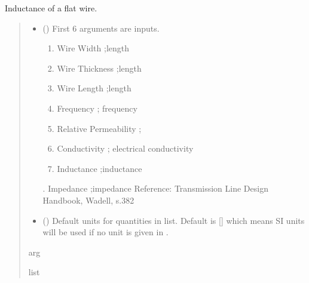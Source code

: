 \documentclass[letterpaper,10pt,english]{sphinxmanual}
\begin{document}

\begin{fulllineitems}
\label{\detokenize{components:components.L_StraightFlatWire}}
\pysigstartsignatures
{}
\pysigstopsignatures
\sphinxAtStartPar
Inductance of a flat wire.
\begin{quote}\begin{description}
\begin{itemize}
\item {} 
\sphinxAtStartPar
{} () \textendash{} 
\sphinxAtStartPar
First 6 arguments are inputs.
\begin{enumerate}
%
\item {} 
\sphinxAtStartPar
Wire Width ;length

\item {} 
\sphinxAtStartPar
Wire Thickness ;length

\item {} 
\sphinxAtStartPar
Wire Length ;length

\item {} 
\sphinxAtStartPar
Frequency ; frequency

\item {} 
\sphinxAtStartPar
Relative Permeability ;

\item {} 
\sphinxAtStartPar
Conductivity ; electrical conductivity

\item {} 
\sphinxAtStartPar
Inductance ;inductance

\end{enumerate}

.  Impedance ;impedance
Reference:  Transmission Line Design Handbook, Wadell, s.382


\item {} 
\sphinxAtStartPar
{} (\sphinxstyleliteralemphasis{\sphinxupquote{, }}) \textendash{} Default units for quantities in  list. Default is {[}{]} which means SI units will be used if no unit is given in .

\end{itemize}

\sphinxAtStartPar
arg

\sphinxAtStartPar
list

\end{description}\end{quote}

\end{fulllineitems}
\end{document}
